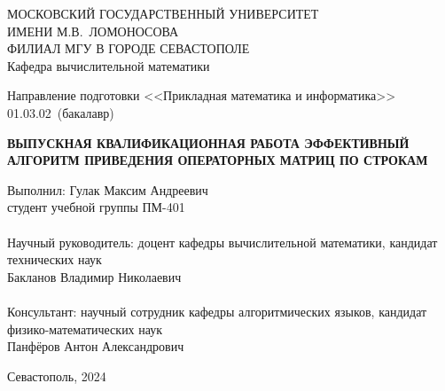 \thispagestyle{empty}
\begin{center}  
	МОСКОВСКИЙ ГОСУДАРСТВЕННЫЙ УНИВЕРСИТЕТ \\ИМЕНИ М.В.~ЛОМОНОСОВА\\
    ФИЛИАЛ МГУ В ГОРОДЕ СЕВАСТОПОЛЕ\\
	Кафедра вычислительной математики
\end{center}

\begin{center}
    Направление подготовки <<Прикладная математика и информатика>>\\
    01.03.02~(бакалавр)
\end{center}

\begin{center}
    \vfill
    \bf{ВЫПУСКНАЯ КВАЛИФИКАЦИОННАЯ РАБОТА}
    \vfill
    \bf{ЭФФЕКТИВНЫЙ АЛГОРИТМ ПРИВЕДЕНИЯ ОПЕРАТОРНЫХ МАТРИЦ ПО СТРОКАМ}
\end{center}

\vfill

\null\hfill
\begin{minipage}{0.5\textwidth}
    Выполнил: Гулак Максим Андреевич\\
    студент учебной группы ПМ-401\\
    \\
    Научный руководитель: доцент кафедры
    вычислительной математики, кандидат
    технических наук \\Бакланов Владимир Николаевич
    \\\\
    Консультант:
    научный сотрудник кафедры
    алгоритмических языков, кандидат
    физико-математических наук\\
    Панфёров Антон Александрович
\end{minipage}
\vfill
\begin{center}
	\large{Севастополь, 2024}
\end{center}
\kern-2cm





